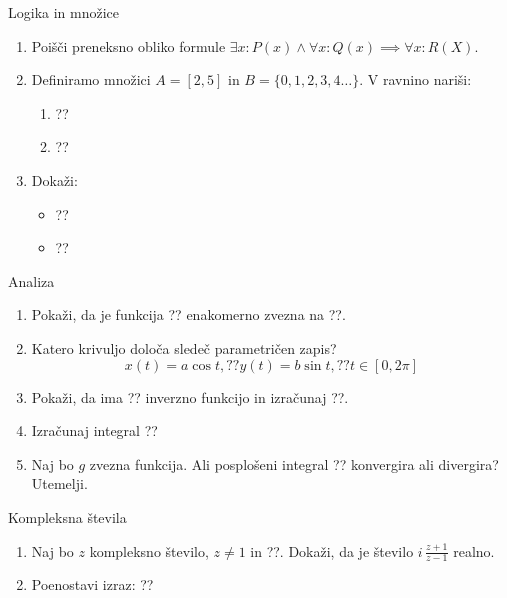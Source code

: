 \begin{frame}{Logika in množice}
	\begin{enumerate}
		\item
		Poišči preneksno obliko formule \(\exists x \colon P(x) \wedge \forall x \colon Q(x) \implies \forall x \colon R(X) \).
		\item 
		Definiramo množici \(A=[2,5]\) in \(B= \{ 0,1,2,3,4 \ldots \} \).
		V ravnino nariši:
		\begin{enumerate}
		   \item ??
		   \item ??
		\end{enumerate}
		\item
		Dokaži:
		\begin{itemize}
			\item ??
			\item ??
		\end{itemize}
	\end{enumerate}
\end{frame}

\begin{frame}{Analiza}
	\begin{enumerate}
		\item
		Pokaži, da je funkcija ?? enakomerno zvezna na ??.
		\item 
		Katero krivuljo določa sledeč parametričen zapis?
		$$
		   x(t) = a \cos t, ?? %
		   y(t) = b \sin t, ?? %
		   t \in [0, 2 \pi]
		$$ 
		\item
		Pokaži, da ima ?? inverzno funkcijo in izračunaj ??.
		
		\item
		Izračunaj integral 
		??
		\item 
		Naj bo $g$ zvezna funkcija. Ali posplošeni integral 
		??
		konvergira ali divergira? Utemelji.
	\end{enumerate}
\end{frame}

\begin{frame}{Kompleksna števila}
	\begin{enumerate}
		\item
		Naj bo $z$ kompleksno število, $z \ne 1$ in ??.
		Dokaži, da je število \( i \, \frac{z+1}{z-1} \) realno.
		\item
		Poenostavi izraz:
		??
	\end{enumerate}
\end{frame}